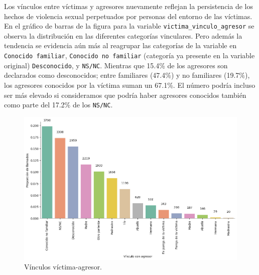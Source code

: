 \documentclass[10 pt]{article}
\begin{document}
Los vínculos entre víctimas y agresores nuevamente reflejan la persistencia de los hechos de violencia sexual perpetuados por personas del entorno de las víctimas. En el gráfico de barras de la figura  para la variable \texttt{victima\_vinculo\_agresor} se observa la distribución en las diferentes categorías vinculares. Pero además la tendencia se evidencia aún más al reagrupar las categorías de la variable en \texttt{Conocido familiar}, \texttt{Conocido no familiar} (categoría ya presente en la variable original) \texttt{Desconocido}, y \texttt{NS/NC}. Mientras que 15.4\% de los agresores son declarados como desconocidos; entre familiares (47.4\%) y no familiares (19.7\%), los agresores conocidos por la víctima suman un 67.1\%. El número podría incluso ser más elevado si consideramos que podría haber agresores conocidos también como parte del 17.2\% de los \texttt{NS/NC}.



\begin{figure}[H]
    \begin{center}
    \includegraphics[scale=.5]{images/latex_vinculo_agr_victima.png}
    \caption{Vínculos víctima-agresor.}
    \label{vinculoagresor}
    \end{center}
    \end{figure}
\end{document}
